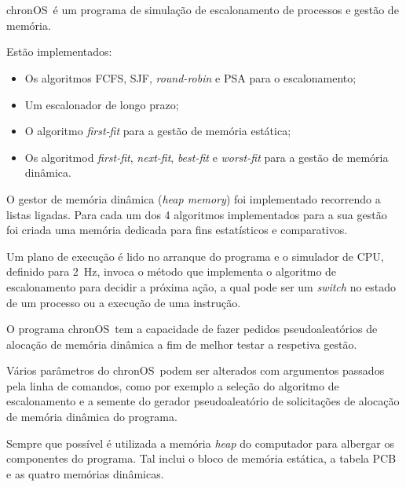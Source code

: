 \documentclass[10pt,oneside]{estiloUBI}
\newcommand{\chronOS}{\textsf{chronOS}}
\begin{document}
	\onehalfspacing
	
	
	
	\pagestyle{fancy}
	
	\newpage
	
	\section*{}
	\vspace{0.5cm}
	
	\chronOS~é um programa de simulação de escalonamento de processos e gestão de memória.
	
	Estão implementados:
	
	\begin{itemize}
		\item Os algoritmos \ac{FCFS}, \ac{SJF}, \textit{round-robin} e \ac{PSA} para o escalonamento;
		\item Um escalonador de longo prazo;
		\item O algoritmo \textit{first-fit} para a gestão de memória estática;
		\item Os algoritmod \textit{first-fit}, \textit{next-fit}, \textit{best-fit} e \textit{worst-fit} para a gestão de memória dinâmica.
	\end{itemize}
	
	O gestor de memória dinâmica (\textit{heap memory}) foi implementado recorrendo a listas ligadas. Para cada um dos 4 algoritmos implementados para a sua gestão foi criada uma memória dedicada para fins estatísticos e comparativos.
	
	Um plano de execução é lido no arranque do programa e o simulador de CPU, definido para \SI{2}{\hertz}, invoca o método que implementa o algoritmo de escalonamento para decidir a próxima ação, a qual pode ser um \textit{switch} no estado de um processo ou a execução de uma instrução.
	
	O programa \chronOS~tem a capacidade de fazer pedidos pseudoaleatórios de alocação de memória dinâmica a fim de melhor testar a respetiva gestão.
	
	Vários parâmetros do \chronOS~podem ser alterados com argumentos passados pela linha de comandos, como por exemplo a seleção do algoritmo de escalonamento e a semente do gerador pseudoaleatório de solicitações de alocação de memória dinâmica do programa.
	
	Sempre que possível é utilizada a memória \textit{heap} do computador para albergar os componentes do programa. Tal inclui o bloco de memória estática, a tabela PCB e as quatro memórias dinâmicas.
	
\end{document}

